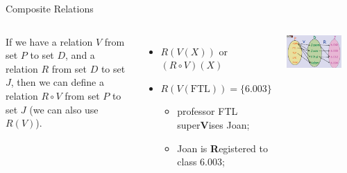 \begin{frame}{Composite Relations}

  \begin{columns}[t]

    If we have a relation $V$ from set $P$ to set $D$, and a relation $R$ from set $D$ to set $J$, then we can define a  relation $R\circ V$ from set $P$ to set $J$ (we can also use $R(V)$).\bigskip

    \begin{itemize}
    \item $R(V(X))$ or $(R\circ V)(X)$
    \item $R(V(\text{FTL})) = \{6.003\}$
    \begin{itemize}
      \item professor FTL super{\bf V}ises Joan;\bigskip

      \item Joan is {\bf R}egistered to class 6.003;
    \end{itemize}
    \end{itemize}


    \begin{center}
      \includegraphics[width=0.8\textwidth]{../img/composite_relation}
    \end{center}

  \end{columns}
\end{frame}


